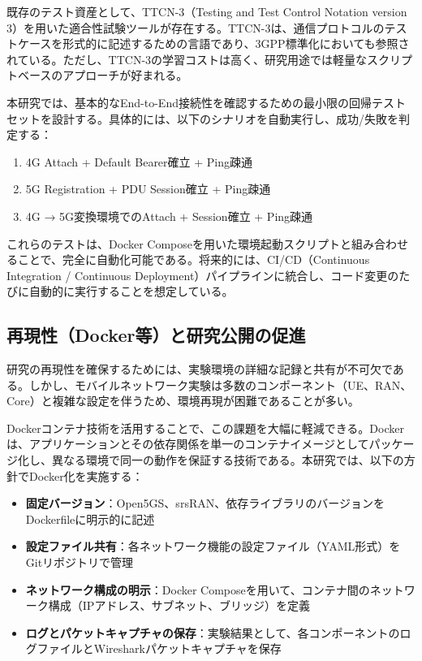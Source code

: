 既存のテスト資産として、TTCN-3（Testing and Test Control Notation version 3）を用いた適合性試験ツールが存在する。TTCN-3は、通信プロトコルのテストケースを形式的に記述するための言語であり、3GPP標準化においても参照されている。ただし、TTCN-3の学習コストは高く、研究用途では軽量なスクリプトベースのアプローチが好まれる。

本研究では、基本的なEnd-to-End接続性を確認するための最小限の回帰テストセットを設計する。具体的には、以下のシナリオを自動実行し、成功/失敗を判定する：

\begin{enumerate}
\item 4G Attach + Default Bearer確立 + Ping疎通
\item 5G Registration + PDU Session確立 + Ping疎通
\item 4G → 5G変換環境でのAttach + Session確立 + Ping疎通
\end{enumerate}

これらのテストは、Docker Composeを用いた環境起動スクリプトと組み合わせることで、完全に自動化可能である。将来的には、CI/CD（Continuous Integration / Continuous Deployment）パイプラインに統合し、コード変更のたびに自動的に実行することを想定している。

\subsection{再現性（Docker等）と研究公開の促進}

研究の再現性を確保するためには、実験環境の詳細な記録と共有が不可欠である。しかし、モバイルネットワーク実験は多数のコンポーネント（UE、RAN、Core）と複雑な設定を伴うため、環境再現が困難であることが多い。

Dockerコンテナ技術を活用することで、この課題を大幅に軽減できる。Dockerは、アプリケーションとその依存関係を単一のコンテナイメージとしてパッケージ化し、異なる環境で同一の動作を保証する技術である。本研究では、以下の方針でDocker化を実施する：

\begin{itemize}
\item \textbf{固定バージョン}：Open5GS、srsRAN、依存ライブラリのバージョンをDockerfileに明示的に記述
\item \textbf{設定ファイル共有}：各ネットワーク機能の設定ファイル（YAML形式）をGitリポジトリで管理
\item \textbf{ネットワーク構成の明示}：Docker Composeを用いて、コンテナ間のネットワーク構成（IPアドレス、サブネット、ブリッジ）を定義
\item \textbf{ログとパケットキャプチャの保存}：実験結果として、各コンポーネントのログファイルとWiresharkパケットキャプチャを保存
\end{itemize}

